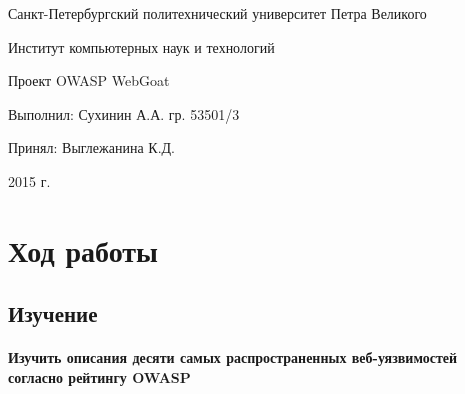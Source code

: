 \documentclass{article}
\begin{document}
\begin{titlepage} \begin{center}

	\Large			
Санкт-Петербургский политехнический университет Петра Великого
			
	\vspace{0.2cm}	
Институт компьютерных наук и технологий
		
	\vspace{2cm} \vfill \huge
Проект OWASP WebGoat
		
	\vfill 
	\begin{flushleft} \large \hangindent=8cm 
Выполнил: Сухинин А.А. гр. 53501/3 \hrulefill
			
Принял: Выглежанина К.Д. \hrulefill
	\end{flushleft}
		
	\vspace{2cm} \vfill \LARGE
2015 г.
		
\end{center} \end{titlepage}

\section{Ход работы}
\subsection{Изучение}

\paragraph{Изучить описания десяти самых распространенных веб-уязвимостей согласно рейтингу OWASP}
\end{document}
